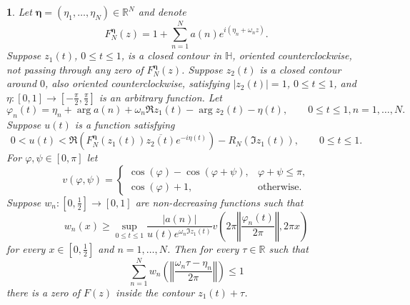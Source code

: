 \documentclass[10pt,a4paper]{amsart}
\newtheorem{prop}{}
\begin{document}
\begin{prop}
\label{prop:sufficient-condition}Let $\boldsymbol{\eta}=(\eta_{1},\dotsc,\eta_{N})\in\mathbb{R}^{N}$
and denote
\[
F_{N}^{\boldsymbol{\eta}}(z)=1+\sum_{n=1}^{N}a(n)e^{i\left(\eta_{n}+\omega_{n}z\right)}.
\]
Suppose $z_{1}(t)$, $0\leq t\leq1$, is a closed contour in $\mathbb{H}$,
oriented counterclockwise, not passing through any zero of $F_{N}^{\boldsymbol{\eta}}(z)$.
Suppose $z_{2}(t)$ is a closed contour around $0$, also oriented
counterclockwise, satisfying $\left|z_{2}(t)\right|=1$, $0\leq t\leq1$,
and $\eta:[0,1]\to[-\tfrac{\pi}{2},\tfrac{\pi}{2}]$ is an arbitrary
function. Let
\[
\varphi_{n}(t)=\eta_{n}+\arg a(n)+\omega_{n}\Re z_{1}(t)-\arg z_{2}(t)-\eta(t),\qquad0\leq t\leq1,n=1,\dotsc,N.
\]
Suppose $u(t)$ is a function satisfying
\[
0<u(t)<\Re\left(F_{N}^{\boldsymbol{\eta}}(z_{1}(t))\overline{z_{2}(t)}e^{-i\eta(t)}\right)-R_{N}(\Im z_{1}(t)),\qquad0\leq t\leq1.
\]
For $\varphi,\psi\in[0,\pi]$ let 
\[
v(\varphi,\psi)=\begin{cases}
\cos\left(\varphi\right)-\cos\left(\varphi+\psi\right), & \varphi+\psi\leq\pi,\\
\cos\left(\varphi\right)+1, & \text{otherwise.}
\end{cases}
\]
Suppose $w_{n}:[0,\tfrac{1}{2}]\to[0,1]$ are non-decreasing functions
such that
\begin{equation}
w_{n}(x)\geq\sup_{0\leq t\leq1}\frac{\left|a(n)\right|}{u(t)e^{\omega_{n}\Im z_{1}(t)}}v\left(2\pi\left\Vert \frac{\varphi_{n}(t)}{2\pi}\right\Vert ,2\pi x\right)\label{eq:wn(x)-assumption}
\end{equation}
for every $x\in[0,\tfrac{1}{2}]$ and $n=1,\dotsc,N$. Then for every
$\tau\in\mathbb{R}$ such that
\begin{equation}
\sum_{n=1}^{N}w_{n}\left(\left\Vert \frac{\omega_{n}\tau-\eta_{n}}{2\pi}\right\Vert \right)\leq1\label{eq:prop-sum-of-penalties}
\end{equation}
there is a zero of $F(z)$ inside the contour $z_{1}(t)+\tau$.
\end{prop}
\end{document}
